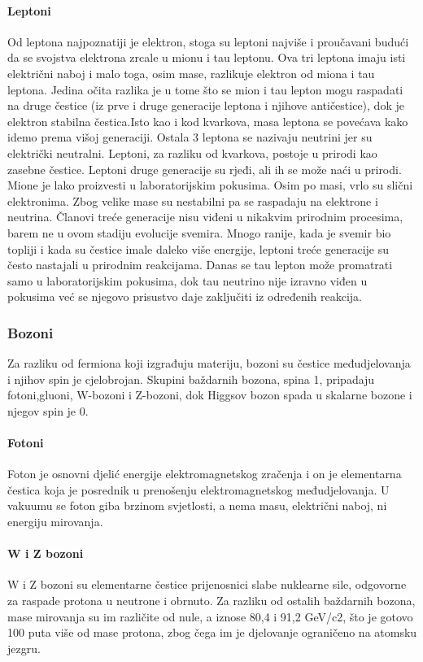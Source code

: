 \documentclass[12pt,a4paper,oneside]{article}
\begin{document}
\begin{linenumbers}
		\paragraph{Leptoni\newline}
		Od leptona najpoznatiji je elektron, stoga su leptoni najviše i proučavani budući da se svojstva elektrona zrcale u mionu i tau leptonu. Ova tri leptona imaju isti električni naboj i malo toga, osim mase, razlikuje elektron od miona i tau leptona. Jedina očita razlika je u tome što se mion i tau lepton mogu raspadati na druge čestice (iz prve i druge generacije leptona i njihove antičestice), dok je elektron stabilna čestica.Isto kao i kod kvarkova, masa leptona se povećava kako idemo prema višoj generaciji.
		Ostala 3 leptona se nazivaju neutrini jer su električki neutralni.
		Leptoni, za razliku od kvarkova, postoje u prirodi kao zasebne čestice. 
		Leptoni druge generacije su rjeđi, ali ih se može naći u prirodi. Mione je lako proizvesti u laboratorijskim pokusima. Osim po masi, vrlo su slični elektronima. Zbog velike mase su nestabilni pa se raspadaju na elektrone i neutrina. Članovi treće generacije nisu viđeni u nikakvim prirodnim procesima, barem ne u ovom stadiju evolucije svemira. Mnogo ranije, kada je svemir bio topliji i kada su čestice imale daleko više energije, leptoni treće generacije su često nastajali u prirodnim reakcijama. Danas se tau lepton može promatrati samo u laboratorijskim pokusima, dok tau neutrino nije izravno viđen u pokusima već se njegovo prisustvo daje zaključiti iz određenih reakcija.
		
		\subsubsection{Bozoni}
		Za razliku od fermiona koji izgrađuju materiju, bozoni su čestice međudjelovanja i njihov spin je cjelobrojan. Skupini baždarnih bozona, spina 1,  pripadaju fotoni,gluoni, W-bozoni i Z-bozoni, dok Higgsov bozon spada u skalarne bozone i njegov spin je 0.
		
		\paragraph{Fotoni\newline}
		Foton je osnovni djelić energije elektromagnetskog zračenja i on je elementarna čestica koja je posrednik u prenošenju elektromagnetskog međudjelovanja. U vakuumu se foton giba brzinom svjetlosti, a nema masu, električni naboj, ni energiju mirovanja.
		\paragraph{W i Z bozoni\newline}
		W i Z bozoni su elementarne čestice prijenosnici slabe nuklearne sile, odgovorne za raspade protona u neutrone i obrnuto. Za razliku od ostalih baždarnih bozona, mase mirovanja su im različite od nule, a iznose 80,4 i 91,2 GeV/c2, što je gotovo 100 puta više od mase protona, zbog čega im je djelovanje ograničeno na atomsku jezgru.

\end{linenumbers}
\end{document}
